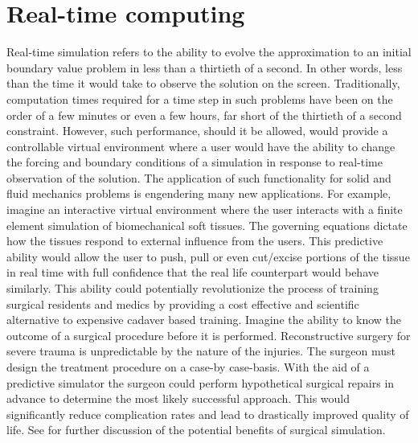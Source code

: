 \section*{Real-time computing}
Real-time simulation refers to the ability to evolve the approximation to an initial boundary value problem in less than a thirtieth of a second. In other words, less than the time it would take to observe the solution on the screen. Traditionally, computation times required for a time step in such problems have been on the order of a few minutes or even a few hours, far short of the thirtieth of a second constraint. However, such performance, should it be allowed, would provide a controllable virtual environment where a user would have the ability to change the forcing and boundary conditions of a simulation in response to real-time observation of the solution. The application of such functionality for solid and fluid mechanics problems is engendering many new applications. For example, imagine an interactive virtual environment where the user interacts with a finite element simulation of biomechanical soft tissues. The governing equations dictate how the tissues respond to external influence from the users. This predictive ability would allow the user to push, pull or even cut/excise portions of the tissue in real time with full confidence that the real life counterpart would behave similarly. This ability could potentially revolutionize the process of training surgical residents and medics by providing a cost effective and scientific alternative to expensive cadaver based training. Imagine the ability to know the outcome of a surgical procedure before it is performed. Reconstructive surgery for severe trauma is unpredictable by the nature of the injuries. The surgeon must design the treatment procedure on a case-by case-basis. With the aid of a predictive simulator the surgeon could perform hypothetical surgical repairs in advance to determine the most likely successful approach. This would significantly reduce complication rates and lead to drastically improved quality of life. See \cite{SHTOC09} for further discussion of the potential benefits of surgical simulation.
